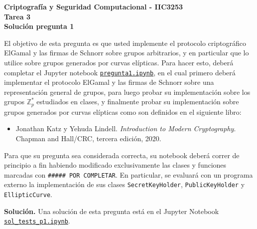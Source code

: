 \documentclass[11pt]{article}
\begin{document}
\begin{center}
  \bf Criptografía y Seguridad Computacional - IIC3253\\
  \bf Tarea 3\\
  \bf Solución pregunta 1
\end{center}

\bigskip

\noindent

\newcommand{\bbit}{\#\text{Bit}}
\newcommand{\dv}{\text{Div}}

El objetivo de esta pregunta es que usted implemente el protocolo
criptográfico ElGamal y las firmas de Schnorr sobre grupos
arbitrarios, y en particular que lo utilice sobre grupos generados por
curvas elípticas. Para hacer esto, deberá completar el Jupyter
notebook
\href{https://github.com/IIC3253/2023/blob/main/tareas/tarea\%203/enunciado/questions/p1/pregunta1.ipynb}{\texttt{pregunta1.ipynb}},
en el cual primero deberá implementar el protocolo ElGamal y las
firmas de Schnorr sobre una representación general de grupos, para
luego probar su implementación sobre los grupos $\mathbb{Z}_p^*$
estudiados en clases, y finalmente probar su implementación sobre grupos
generados por curvas elípticas como son definidos en el siguiente
libro:
\begin{itemize}
  \item Jonathan Katz y Yehuda Lindell. {\em Introduction to Modern Cryptography}. Chapman and Hall/CRC, tercera edición, 2020.
\end{itemize}
Para que su pregunta sea considerada correcta, su notebook deberá
correr de principio a fin habiendo modificado exclusivamente las
clases y funciones marcadas con \texttt{\#\#\#\#\# POR COMPLETAR}. En
particular, se evaluará con un programa externo la implementación de
sus clases \texttt{SecretKeyHolder}, \texttt{PublicKeyHolder} y
\texttt{EllipticCurve}.


\bigskip

\noindent
    {\bf Solución.}
    Una solución de esta pregunta está en el Jupyter Notebook
  \href{https://github.com/IIC3253/2023/blob/main/tareas/tarea\%203/soluciones/p1/sol_tests_p1.ipynb}{\texttt{sol\_tests\_p1.ipynb}}.
  
\end{document}

